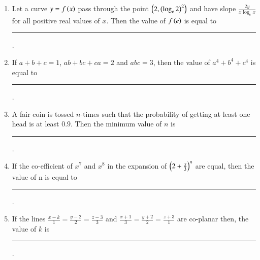 \documentclass[journal,12pt,onecolumn]{IEEEtran}
\theoremstyle{remark}
\begin{document}
\begin{enumerate}
\item Let a curve $y=f\left(x\right)$ pass through the point $\left(2,\left(\log_e{2}\right)^2\right)$ and have slope $\frac{2y}{x\log_e{x}}$ for all positive real values of $x$. Then the value of $f\left(e\right)$ is equal to \rule{1cm}{0.15mm}.

\hfill{}

\item If $a+b+c=1$, $ab+bc+ca=2$ and $abc=3$, then the value of $a^4+b^4+c^4$ is equal to \rule{1cm}{0.15mm}.

\hfill{}

\item A fair coin is tossed $n$-times such that the probability of getting at least one head is at least $0.9$. Then the minimum value of $n$ is \rule{1cm}{0.15mm}. 

\hfill{}

\item If the co-efficient of $x^7$ and $x^8$ in the expansion of $\left(2+\frac{x}{3}\right)^n$ are equal, then the value of n is equal to \rule{1cm}{0.15mm}.

\hfill{}

\item If the lines $\frac{x-k}{1}=\frac{y-2}{2}=\frac{z-3}{3}$ and $\frac{x+1}{3}=\frac{y+2}{2}=\frac{z+3}{1}$ are co-planar then, the value of $k$ is \rule{1cm}{0.15mm}.

\hfill{}

\end{enumerate}
\end{document}
